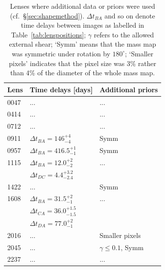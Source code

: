 \documentclass[useAMS,usenatbib]{mn2e}
\begin{document}
\begin{table}
  \begin{center}
    \begin{tabular}{l l l}
      Lens & Time delays [days] & Additional priors \\ \hline
      0047 & ... & ...\\
      0414 & ... & ...\\
      0712 & ... & ...\\
      0911 & $\Delta t_{BA}=146^{+4}_{-4}$ & Symm\\
      0957 & $\Delta t_{BA}=416.5^{+1}_{-1}$ & Symm \\
      1115 & $\Delta t_{BA}=12.0^{+2}_{-2}$ & ...\\
           & $\Delta t_{DC}=4.4^{+3.2}_{-2.4}$ & \\
      1422 & ... & Symm \\
      1608 & $\Delta t_{BA}=31.5^{+2}_{-1}$ & ...\\
           & $\Delta t_{CA}=36.0^{+1.5}_{-1.5}$ & \\
           & $\Delta t_{DA}=77.0^{+2}_{-1}$ & \\
      2016 & ... & Smaller pixels \\
      2045 & ... & $\gamma\leq 0.1$, Symm \\
      2237 & ... & ...\\
    \end{tabular}
    \caption[width=\linewidth]{Lenses where additional data or priors
      were used (cf.~\S\ref{sec:shapemethod}). $\Delta t_{BA}$ and so
      on denote time delays between images as labelled in
      Table~\ref{tab:lenspositions}; $\gamma$ refers to the allowed
      external shear; `Symm' means that the mass map was symmetric
      under rotation by $180^\circ$; `Smaller pixels' indicates that
      the pixel size was 3\% rather than 4\% of the diameter of the
      whole mass map.}
    \label{tab:lenspriors}
  \end{center}
\end{table}
\end{document}
